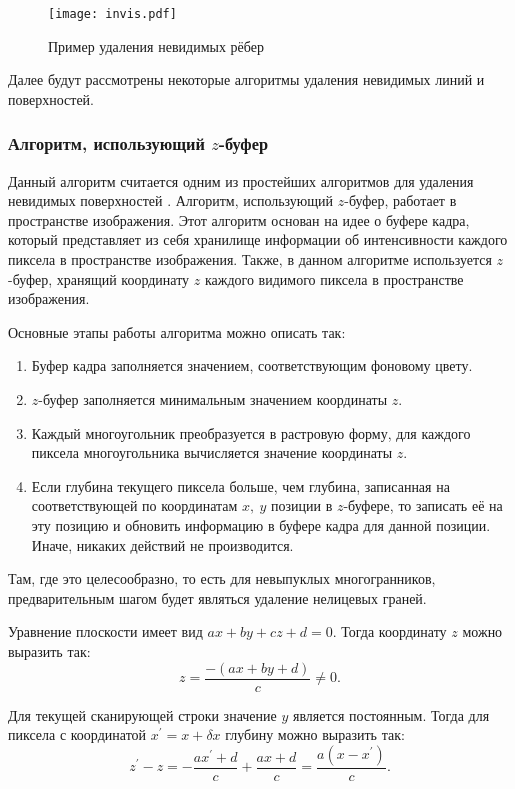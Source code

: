 \begin{figure}[h!]
    \centering
    \texttt{[image: invis.pdf]}
    \caption{Пример удаления невидимых рёбер}
    \label{img:invis}
\end{figure}

Далее будут рассмотрены некоторые алгоритмы удаления невидимых линий и поверхностей.

\subsubsection{Алгоритм, использующий $z$-буфер}
Данный алгоритм считается одним из простейших алгоритмов для удаления невидимых поверхностей \cite{item12}. Алгоритм, использующий $z$-буфер, работает в пространстве изображения. Этот алгоритм основан на идее о буфере кадра, который представляет из себя хранилище информации об интенсивности каждого пиксела в пространстве изображения. Также, в данном алгоритме используется $z$-буфер, хранящий координату $z$ каждого видимого пиксела в пространстве изображения.

Основные этапы работы алгоритма можно описать так:
\begin{enumerate}[label={\arabic*)}]
	\item Буфер кадра заполняется значением, соответствующим фоновому цвету.
	\item $z$-буфер заполняется минимальным значением координаты $z$.
	\item Каждый многоугольник преобразуется в растровую форму, для каждого пиксела многоугольника вычисляется значение координаты $z$.
	\item Если глубина текущего пиксела больше, чем глубина, записанная на соответствующей по координатам $x,\ y$ позиции в $z$-буфере, то записать её на эту позицию и обновить информацию в буфере кадра для данной позиции. Иначе, никаких действий не производится.
\end{enumerate}

Там, где это целесообразно, то есть для невыпуклых многогранников, предварительным шагом будет являться удаление нелицевых граней.

Уравнение плоскости имеет вид $ax + by + cz + d = 0$. Тогда координату $z$ можно выразить так: \begin{equation}
	z = \frac{-(ax + by + d)}{c} \neq 0.
\end{equation}

Для текущей сканирующей строки значение $y$ является постоянным. Тогда для пиксела с координатой $x^{'} = x + \delta x$ глубину можно выразить так: \begin{equation}
	z^{'} - z = -\frac{ax^\prime + d}{c} +\frac{ax + d}{c} = \frac{a(x - x^\prime)}{c}.
\end{equation}

